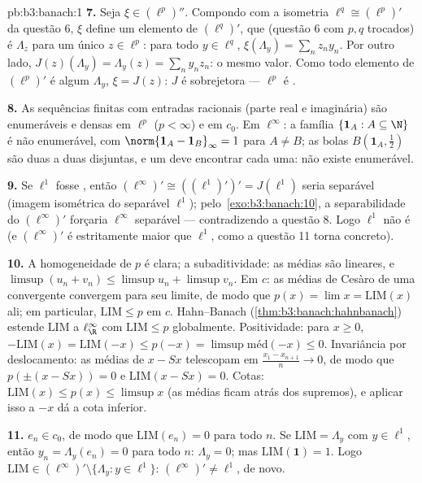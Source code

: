 \begin{solution}{pb:b3:banach:1}
\textbf{7.} Seja $\xi \in (\ell^p)''$. Compondo com a
isometria $\ell^q \cong (\ell^p)'$ da questão 6, $\xi$ define
um elemento de $(\ell^q)'$, que (questão 6 com $p, q$
trocados) é $\Lambda_z$ para um único $z \in \ell^p$: para todo
$y \in \ell^q$, $\xi(\Lambda_y) = \sum_nz_ny_n$. Por outro
lado, $J(z)(\Lambda_y) = \Lambda_y(z) = \sum_ny_nz_n$: o mesmo
valor. Como todo elemento de $(\ell^p)'$ é algum $\Lambda_y$,
$\xi = J(z)$: $J$ é sobrejetora --- $\ell^p$ é .

\textbf{8.} As sequências finitas com entradas racionais (parte real e
imaginária) são enumeráveis e densas em $\ell^p$ ($p < \infty$) e
em $c_0$. Em $\ell^\infty$: a família $\{\mathbf 1_A : A
\subseteq \N\}$ é não enumerável, com $\norm{\mathbf 1_A -
\mathbf 1_B}_\infty = 1$ para $A \neq B$; as bolas $B(\mathbf
1_A, \frac12)$ são duas a duas disjuntas, e um  deve encontrar
cada uma: não existe  enumerável.

\textbf{9.} Se $\ell^1$ fosse , então $(\ell^\infty)'
\cong ((\ell^1)')' = J(\ell^1)$ seria separável (imagem isométrica
do separável $\ell^1$); pelo~\cref{exo:b3:banach:10}, a separabilidade do 
$(\ell^\infty)'$ forçaria $\ell^\infty$ separável ---
contradizendo a questão 8. Logo $\ell^1$ não é  (e
$(\ell^\infty)'$ é estritamente maior que $\ell^1$, como a questão
11 torna concreto).

\textbf{10.} A homogeneidade de $p$ é clara; a subaditividade:
as médias são lineares, e $\limsup(u_n + v_n) \leq \limsup u_n +
\limsup v_n$. Em $c$: as médias de Cesàro de uma convergente
convergem para seu limite, de modo que $p(x) = \lim x =
\mathrm{LIM}(x)$ ali; em particular, $\mathrm{LIM} \leq p$ em
$c$. Hahn--Banach (\cref{thm:b3:banach:hahnbanach}) estende
$\mathrm{LIM}$ a $\ell^\infty_\R$ com $\mathrm{LIM} \leq p$
globalmente. Positividade: para $x \geq 0$, $-\mathrm{LIM}(x) =
\mathrm{LIM}(-x) \leq p(-x) = \limsup\text{méd}(-x) \leq 0$.
Invariância por deslocamento: as médias de $x - Sx$ telescopam em
$\frac{x_1 - x_{n+1}}n \to 0$, de modo que $p(\pm(x - Sx)) = 0$ e
$\mathrm{LIM}(x - Sx) = 0$. Cotas: $\mathrm{LIM}(x) \leq p(x)
\leq \limsup x$ (as médias ficam atrás dos supremos), e aplicar isso
a $-x$ dá a cota inferior.

\textbf{11.} $e_n \in c_0$, de modo que $\mathrm{LIM}(e_n) = 0$ para todo
$n$. Se $\mathrm{LIM} = \Lambda_y$ com $y \in \ell^1$, então
$y_n = \Lambda_y(e_n) = 0$ para todo $n$: $\Lambda_y = 0$; mas
$\mathrm{LIM}(\mathbf 1) = 1$. Logo $\mathrm{LIM} \in
(\ell^\infty)' \setminus \{\Lambda_y : y \in \ell^1\}$:
$(\ell^\infty)' \neq \ell^1$, de novo.


\end{solution}
